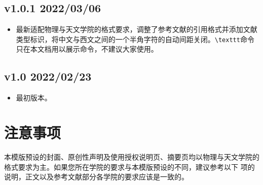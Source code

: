 \subsection*{v1.0.1 2022/03/06}
\begin{itemize}
    \item 最新适配物理与天文学院的格式要求，调整了参考文献的引用格式并添加文献类型标识，将中文与西文之间的一个半角字符的自动间距关闭。\texttt{\textbackslash texttt}命令只在本文档用以展示命令，不建议大家使用。
\end{itemize}

\subsection*{v1.0 2022/02/23}
\begin{itemize}
    \item 最初版本。
\end{itemize}

\section{注意事项}

本模版预设的封面、原创性声明及使用授权说明页、摘要页均以物理与天文学院的格式要求为主。如果您所在学院的要求与本模版预设的不同，建议参考以下 \textdagger 项的说明，正文以及参考文献部分各学院的要求应该是一致的。

